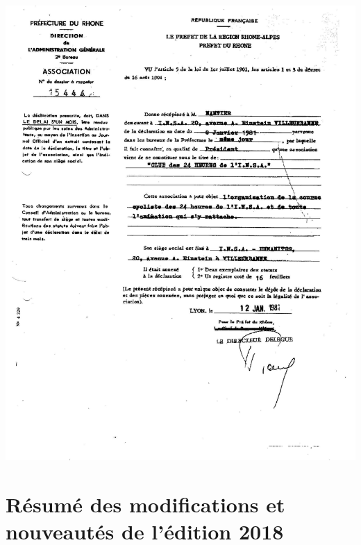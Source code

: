\documentclass[hidelinks, paper=a4, fontsize=13pt]{report}
\begin{document}
\begin{center}
\includegraphics[scale=0.7]{Annexes/Images/decla}
\end{center}

\newpage

\section{Résumé des modifications et nouveautés de l'édition 2018}
\end{document}
